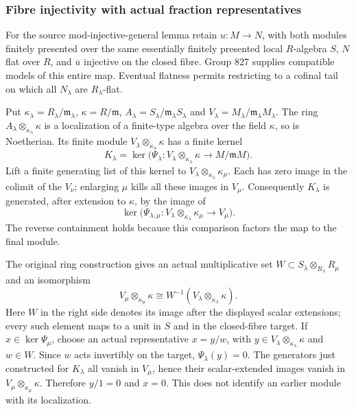 \subsubsection{Fibre injectivity with actual fraction representatives}\label{algebra-proof-038-fibre-injectivity-with-actual-fraction-representatives}

For the source mod-injective-general lemma retain \(u:M\to N\), with both modules finitely presented over the same essentially finitely presented local \(R\)-algebra \(S\), \(N\) flat over \(R\), and \(\overline u\) injective on the closed fibre. Group 827 supplies compatible models of this entire map. Eventual flatness permits restricting to a cofinal tail on which all \(N_\lambda\) are \(R_\lambda\)-flat.

Put \(\kappa_\lambda=R_\lambda/\mathfrak m_\lambda\), \(\kappa=R/\mathfrak m\), \(A_\lambda=S_\lambda/\mathfrak m_\lambda S_\lambda\) and \(V_\lambda=M_\lambda/\mathfrak m_\lambda M_\lambda\). The ring \(A_\lambda\otimes_{\kappa_\lambda}\kappa\) is a localization of a finite-type algebra over the field \(\kappa\), so is Noetherian. Its finite module \(V_\lambda\otimes_{\kappa_\lambda}\kappa\) has a finite kernel \[
K_\lambda=\ker\bigl(\Psi_\lambda:
 V_\lambda\otimes_{\kappa_\lambda}\kappa\longrightarrow M/\mathfrak mM\bigr).
\] Lift a finite generating list of this kernel to \(V_\lambda\otimes_{\kappa_\lambda}\kappa_\mu\). Each has zero image in the colimit of the \(V_\nu\); enlarging \(\mu\) kills all these images in \(V_\mu\). Consequently \(K_\lambda\) is generated, after extension to \(\kappa\), by the image of \[
\ker\bigl(\Psi_{\lambda,\mu}:
 V_\lambda\otimes_{\kappa_\lambda}\kappa_\mu\longrightarrow V_\mu\bigr).
\] The reverse containment holds because this comparison factors the map to the final module.

The original ring construction gives an actual multiplicative set \(W\subset S_\lambda\otimes_{R_\lambda}R_\mu\) and an isomorphism \[
V_\mu\otimes_{\kappa_\mu}\kappa
 \cong W^{-1}(V_\lambda\otimes_{\kappa_\lambda}\kappa).
\] Here \(W\) in the right side denotes its image after the displayed scalar extensions; every such element maps to a unit in \(S\) and in the closed-fibre target. If \(x\in\ker\Psi_\mu\), choose an actual representative \(x=y/w\), with \(y\in V_\lambda\otimes_{\kappa_\lambda}\kappa\) and \(w\in W\). Since \(w\) acts invertibly on the target, \(\Psi_\lambda(y)=0\). The generators just constructed for \(K_\lambda\) all vanish in \(V_\mu\), hence their scalar-extended images vanish in \(V_\mu\otimes_{\kappa_\mu}\kappa\). Therefore \(y/1=0\) and \(x=0\). This does not identify an earlier module with its localization.

